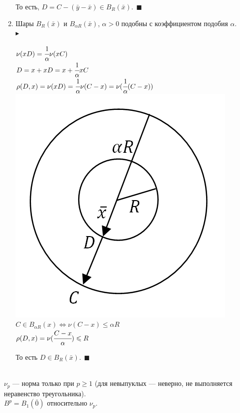 \documentclass[a4paper,12pt]{article}
\begin{document}
\begin{defintion}
\begin{enumerate}
	То есть, $D = C-(\bar y-\bar x) \in B_R(\bar x). ~~\blacksquare$
	\item Шары $B_R(\bar x)$ и $ B_{\alpha R}(\bar x)$, $\alpha > 0$ подобны с коэффициентом подобия $\alpha$.\\ 
	$\blacktriangleright$ \begin{center}$\nu(x D) = \cfrac{1}{\alpha}\nu(x C)$\\
		$D = x+xD = x+\cfrac{1}{\alpha}xC$\\
		$\rho(D, x) = \nu(x D) = \cfrac{1}{\alpha}\nu(C-x) = \nu(\cfrac{1}{\alpha}(C-x))$\\
		\includegraphics[scale=0.5]{l4_10.png}\\
		$C \in B_{\alpha R}(x) \Leftrightarrow \nu(C-x) \leqslant \alpha R$\\
		$\rho(D, x) = \nu(\cfrac{C-x}{\alpha}) \leqslant R$\end{center} То есть $D \in B_R(\bar x). ~~\blacksquare$
\end{enumerate}
~\\$\nu_p$ --- норма только при $p \geqslant 1$ (для невыпуклых --- неверно, не выполняется неравенство треугольника).\\
$B^p = B_1(\bar 0)$ относительно $\nu_p$.\begin{center}

\end{center}
\end{defintion}
\end{document}
